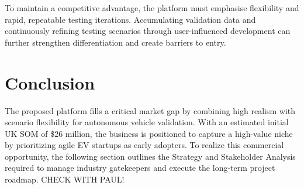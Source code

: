 To maintain a competitive advantage, the platform must emphasise flexibility and rapid, repeatable testing iterations. Accumulating validation data and continuously refining testing scenarios through user-influenced development can further strengthen differentiation and create barriers to entry.

\section{Conclusion}

The proposed platform fills a critical market gap by combining high realism with scenario flexibility for autonomous vehicle validation. With an estimated initial UK SOM of \$26 million, the business is positioned to capture a high-value niche by prioritizing agile EV startups as early adopters. To realize this commercial opportunity, the following section outlines the Strategy and Stakeholder Analysis required to manage industry gatekeepers and execute the long-term project roadmap.
CHECK WITH PAUL!
\compactbib
